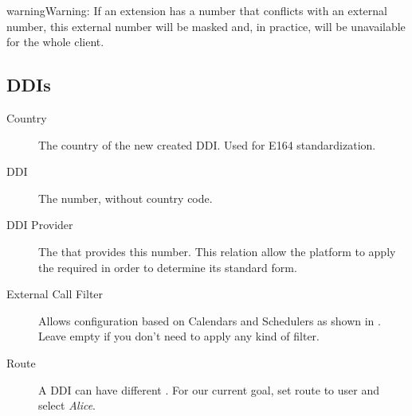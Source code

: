 \documentclass[letterpaper,10pt,english]{sphinxmanual}
\begin{document}
\begin{notice}{warning}{Warning:}
If an extension has a number that conflicts with an external
number, this external number will be masked and, in practice, will be
unavailable for the whole client.
\end{notice}


\subsection{DDIs}
\label{administration_portal/client/vpbx/ddis:ddis}\label{administration_portal/client/vpbx/ddis::doc}\label{administration_portal/client/vpbx/ddis:pbx-ddis}\begin{description}
\item[{Country}] \leavevmode{}\label{administration_portal/client/vpbx/ddis:term-country}
The country of the new created DDI. Used for E164 standardization.

\item[{DDI}] \leavevmode{}\label{administration_portal/client/vpbx/ddis:term-ddi}
The number, without country code.

\item[{DDI Provider}] \leavevmode{}\label{administration_portal/client/vpbx/ddis:term-ddi-provider}
The {\hyperref[administration_portal/brand/providers/ddi_providers:ddi\string-providers]{}} that provides this number. This relation allow
the platform to apply the required {\hyperref[administration_portal/brand/settings/numeric_transformations:transformations]{}} in
order to determine its standard form.

\item[{External Call Filter}] \leavevmode{}\label{administration_portal/client/vpbx/ddis:term-external-call-filter}
Allows configuration based on Calendars and Schedulers as shown in
{\hyperref[administration_portal/client/vpbx/routing_tools/external_call_filters:external\string-call\string-filters]{}}. Leave empty if you don't need to apply any
kind of filter.

\item[{Route}] \leavevmode{}\label{administration_portal/client/vpbx/ddis:term-route}
A DDI can have different {\hyperref[administration_portal/client/vpbx/ddis:routing\string-logics]{}}. For our
current goal, set route to user and select \emph{Alice}.


\end{description}
\end{document}
